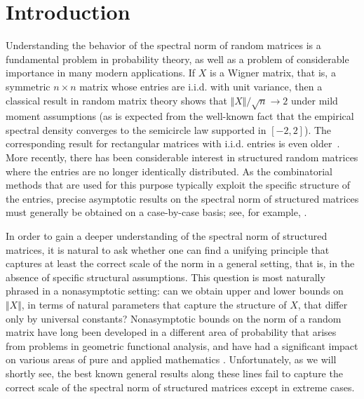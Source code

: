\documentclass[aop,MSNbibl,dvips]{arximspdf}
\newcommand{\rrVert}{\Vert}
\newcommand{\llVert}{\Vert}
\begin{document}
\begin{frontmatter}
%
\begin{keyword}[class=AMS]
\end{keyword}
%
\begin{keyword}
\end{keyword}
%
\end{frontmatter}

\section{Introduction}\label{sec1}

Understanding the behavior of the spectral norm of random matrices is a
fundamental problem in probability theory, as well as a problem of
considerable importance in many modern applications. If $X$ is a Wigner
matrix, that is, a symmetric $n\times n$ matrix whose entries are
i.i.d. with unit variance, then a classical result in random matrix theory
\cite{FK81,BY88,AGZ10,Tao12} shows that $\llVert X\rrVert /\sqrt{n}\to
2$ under mild
moment
assumptions (as is expected from the well-known fact that the empirical
spectral density converges to the semicircle law supported in $[-2,2]$).
The corresponding result for rectangular matrices with i.i.d. entries is
even older~\cite{Gem80}. More recently, there has been considerable
interest in structured random matrices where the entries are no longer
identically distributed. As the combinatorial methods that are used for
this purpose typically exploit the specific structure of the entries,
precise asymptotic results on the spectral norm of structured matrices
must generally be obtained on a case-by-case basis; see, for example,
\cite{Sod09,Sod10}.

In order to gain a deeper understanding of the spectral norm of structured
matrices, it is natural to ask whether one can find a unifying principle
that captures at least the correct scale of the norm in a general setting,
that is, in the absence of specific structural assumptions. This question
is most naturally phrased in a nonasymptotic setting: can we obtain upper
and lower bounds on $\llVert X\rrVert $, in terms of natural
parameters that capture
the structure of $X$, that differ only by universal constants?
Nonasymptotic bounds on the norm of a random matrix have long been
developed in a different area of probability that arises from problems in
geometric functional analysis, and have had a significant impact on
various areas of pure and applied mathematics
\cite{DS01,RV10,Ver12}. Unfortunately, as we will shortly see, the
best known general results along these lines fail to capture the correct
scale of the spectral norm of structured matrices except in extreme
cases.
\end{document}
